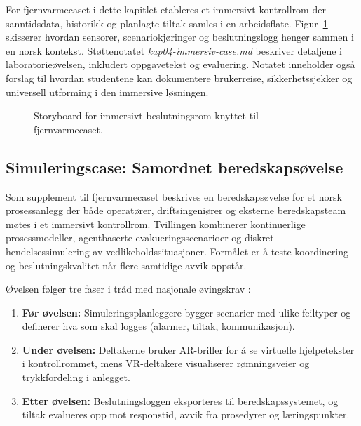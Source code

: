 For fjernvarmecaset i dette kapitlet etableres et immersivt kontrollrom der sanntidsdata, historikk og planlagte tiltak samles i en arbeidsflate. Figur~\ref{fig:kap04-immersiv-beslutning} skisserer hvordan sensorer, scenariokjøringer og beslutningslogg henger sammen i en norsk kontekst. Støttenotatet \textit{kap04-immersiv-case.md} beskriver detaljene i laboratorieøvelsen, inkludert oppgavetekst og evaluering. Notatet inneholder også forslag til hvordan studentene kan dokumentere brukerreise, sikkerhetssjekker og universell utforming i den immersive løsningen.

\begin{figure}[htbp]
    \centering
    \caption{Storyboard for immersivt beslutningsrom knyttet til fjernvarmecaset.}
    \label{fig:kap04-immersiv-beslutning}
\end{figure}

\subsection{Simuleringscase: Samordnet beredskapsøvelse}
Som supplement til fjernvarmecaset beskrives en beredskapsøvelse for et norsk prosessanlegg der både operatører, driftsingeniører og eksterne beredskapsteam møtes i et immersivt kontrollrom. Tvillingen kombinerer kontinuerlige prosessmodeller, agentbaserte evakueringsscenarioer og diskret hendelsessimulering av vedlikeholdssituasjoner. Formålet er å teste koordinering og beslutningskvalitet når flere samtidige avvik oppstår.

Øvelsen følger tre faser i tråd med nasjonale øvingskrav \citep{dsb2023ovelser}:
\begin{enumerate}
    \item \textbf{Før øvelsen:} Simuleringsplanleggere bygger scenarier med ulike feiltyper og definerer hva som skal logges (alarmer, tiltak, kommunikasjon).
    \item \textbf{Under øvelsen:} Deltakerne bruker AR-briller for å se virtuelle hjelpetekster i kontrollrommet, mens VR-deltakere visualiserer rømningsveier og trykkfordeling i anlegget.
    \item \textbf{Etter øvelsen:} Beslutningsloggen eksporteres til beredskapssystemet, og tiltak evalueres opp mot responstid, avvik fra prosedyrer og læringspunkter.
\end{enumerate}

